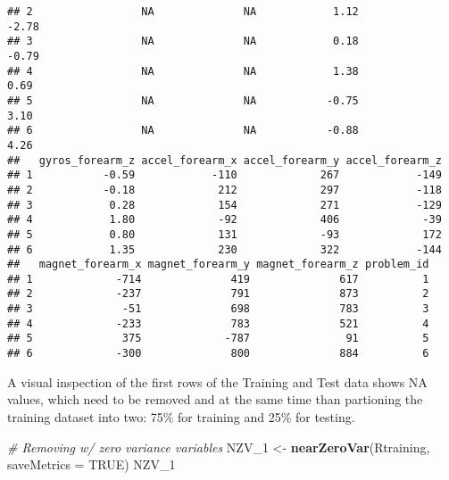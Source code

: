 \documentclass[]{article}
\newenvironment{Shaded}{\begin{snugshade}}{\end{snugshade}}
\newcommand{\CommentTok}[1]{\textcolor[rgb]{0.56,0.35,0.01}{\textit{#1}}}
\newcommand{\DataTypeTok}[1]{\textcolor[rgb]{0.13,0.29,0.53}{#1}}
\newcommand{\DecValTok}[1]{\textcolor[rgb]{0.00,0.00,0.81}{#1}}
\newcommand{\FloatTok}[1]{\textcolor[rgb]{0.00,0.00,0.81}{#1}}
\newcommand{\KeywordTok}[1]{\textcolor[rgb]{0.13,0.29,0.53}{\textbf{#1}}}
\newcommand{\NormalTok}[1]{#1}
\newcommand{\OperatorTok}[1]{\textcolor[rgb]{0.81,0.36,0.00}{\textbf{#1}}}
\newcommand{\OtherTok}[1]{\textcolor[rgb]{0.56,0.35,0.01}{#1}}
\newcommand{\StringTok}[1]{\textcolor[rgb]{0.31,0.60,0.02}{#1}}
\begin{document}
\begin{verbatim}
## 2                 NA              NA            1.12           -2.78
## 3                 NA              NA            0.18           -0.79
## 4                 NA              NA            1.38            0.69
## 5                 NA              NA           -0.75            3.10
## 6                 NA              NA           -0.88            4.26
##   gyros_forearm_z accel_forearm_x accel_forearm_y accel_forearm_z
## 1           -0.59            -110             267            -149
## 2           -0.18             212             297            -118
## 3            0.28             154             271            -129
## 4            1.80             -92             406             -39
## 5            0.80             131             -93             172
## 6            1.35             230             322            -144
##   magnet_forearm_x magnet_forearm_y magnet_forearm_z problem_id
## 1             -714              419              617          1
## 2             -237              791              873          2
## 3              -51              698              783          3
## 4             -233              783              521          4
## 5              375             -787               91          5
## 6             -300              800              884          6
\end{verbatim}

A visual inspection of the first rows of the Training and Test data
shows NA values, which need to be removed and at the same time than
partioning the training dataset into two: 75\% for training and 25\% for
testing.

\begin{Shaded}
\end{Shaded}

\begin{Shaded}
\begin{Highlighting}[]
\CommentTok{# Removing w/ zero variance variables}
\NormalTok{NZV_}\DecValTok{1}\NormalTok{ <-}\StringTok{ }\KeywordTok{nearZeroVar}\NormalTok{(Rtraining, }\DataTypeTok{saveMetrics =} \OtherTok{TRUE}\NormalTok{)}
\NormalTok{NZV_}\DecValTok{1}
\end{Highlighting}
\end{Shaded}
\end{document}
